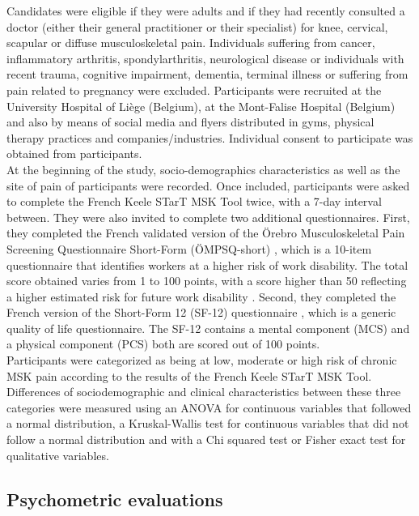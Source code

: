 Candidates were eligible if they were adults and if they had recently consulted a doctor (either their general practitioner or their specialist) for knee, cervical, scapular or diffuse musculoskeletal pain. Individuals suffering from cancer, inflammatory arthritis, spondylarthritis, neurological disease or individuals with recent trauma, cognitive impairment, dementia, terminal illness or suffering from pain related to pregnancy were excluded. Participants were recruited at the University Hospital of Liège (Belgium), at the Mont-Falise Hospital (Belgium) and also by means of social media and flyers distributed in gyms, physical therapy practices and companies/industries. Individual consent to participate was obtained from participants.\\
At the beginning of the study, socio-demographics characteristics as well as the site of pain of participants were recorded. Once included, participants were asked to complete the French Keele STarT MSK Tool twice, with a 7-day interval between. They were also invited to complete two additional questionnaires. First, they completed the French validated version of the Örebro Musculoskeletal Pain Screening Questionnaire Short-Form (ÖMPSQ-short) \citep{gabel2012orebro,hilfiker2016validity}, which is a 10-item questionnaire that identifies workers at a higher risk of work disability. The total score obtained varies from 1 to 100 points, with a score higher than 50 reflecting a higher estimated risk for future work disability \citep{linton2011development}. Second, they completed the French version of the Short-Form 12 (SF-12) questionnaire \citep{jenkinson1997development}, which is a generic quality of life questionnaire. The SF-12 contains a mental component (MCS) and a physical component (PCS) both are scored out of 100 points. \\
Participants were categorized as being at low, moderate or high risk of chronic MSK pain according to the results of the French Keele STarT MSK Tool. Differences of sociodemographic and clinical characteristics between these three categories were measured using an ANOVA for continuous variables that followed a normal distribution, a Kruskal-Wallis test for continuous variables that did not follow a normal distribution and with a Chi squared test or Fisher exact test for qualitative variables. 
 
\medbreak
 
\subsection{Psychometric evaluations}

